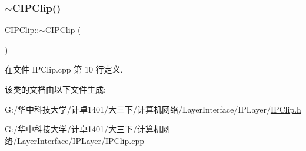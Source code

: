 \subsubsection{\texorpdfstring{$\sim$\+C\+I\+P\+Clip()}{~CIPClip()}}
{\footnotesize\ttfamily C\+I\+P\+Clip\+::$\sim$\+C\+I\+P\+Clip (\begin{DoxyParamCaption}{ }\end{DoxyParamCaption})}



在文件 I\+P\+Clip.\+cpp 第 10 行定义.



该类的文档由以下文件生成\+:\begin{DoxyCompactItemize}
\item 
G\+:/华中科技大学/计卓1401/大三下/计算机网络/\+Layer\+Interface/\+I\+P\+Layer/\hyperlink{_i_p_clip_8h}{I\+P\+Clip.\+h}\item 
G\+:/华中科技大学/计卓1401/大三下/计算机网络/\+Layer\+Interface/\+I\+P\+Layer/\hyperlink{_i_p_clip_8cpp}{I\+P\+Clip.\+cpp}\end{DoxyCompactItemize}
